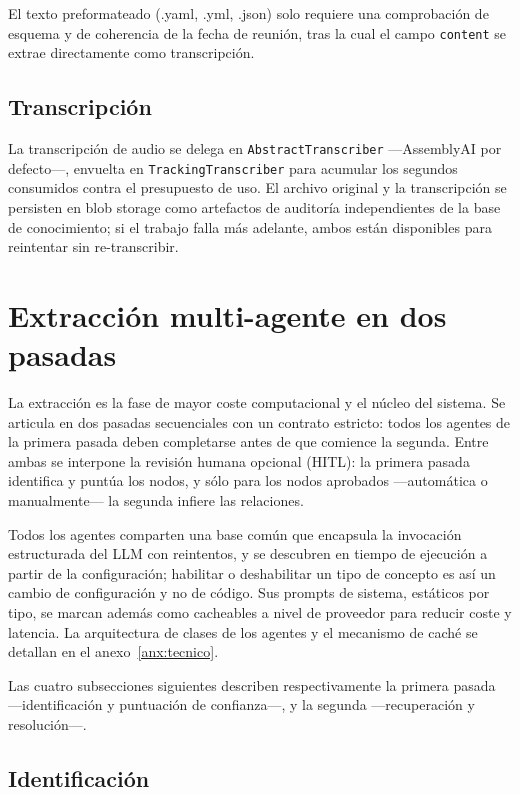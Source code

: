 El texto preformateado (.yaml, .yml, .json) solo requiere una comprobación de esquema y de
coherencia de la fecha de reunión, tras la cual el campo \texttt{content} se extrae directamente
como transcripción.

\subsection{Transcripción}

La transcripción de audio se delega en \texttt{AbstractTranscriber} —AssemblyAI por defecto—,
envuelta en \texttt{TrackingTranscriber} para acumular los segundos consumidos contra el
presupuesto de uso. El archivo original y la transcripción se persisten en blob storage como
artefactos de auditoría independientes de la base de conocimiento; si el trabajo falla más
adelante, ambos están disponibles para reintentar sin re-transcribir.

\section{Extracción multi-agente en dos pasadas}

La extracción es la fase de mayor coste computacional y el núcleo del sistema. Se articula en
dos pasadas secuenciales con un contrato estricto: todos los agentes de la primera pasada deben
completarse antes de que comience la segunda. Entre ambas se interpone la revisión humana opcional
(HITL): la primera pasada identifica y puntúa los nodos, y sólo para los nodos aprobados
—automática o manualmente— la segunda infiere las relaciones.

Todos los agentes comparten una base común que encapsula la invocación estructurada del LLM con
reintentos, y se descubren en tiempo de ejecución a partir de la configuración; habilitar o
deshabilitar un tipo de concepto es así un cambio de configuración y no de código. Sus prompts
de sistema, estáticos por tipo, se marcan además como cacheables a nivel de proveedor para
reducir coste y latencia. La arquitectura de clases de los agentes y el mecanismo de caché se
detallan en el anexo~\ref{anx:tecnico}.

Las cuatro subsecciones siguientes describen respectivamente la primera pasada —identificación y puntuación de
confianza—, y la segunda —recuperación y resolución—.

\subsection{Identificación}
\label{sec:agentes-identificacion}

